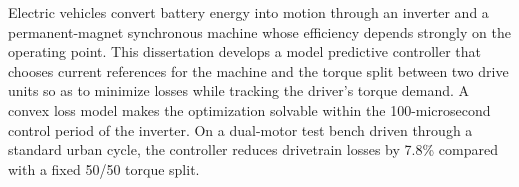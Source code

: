 Electric vehicles convert battery energy into motion through an inverter and a permanent-magnet
synchronous machine whose efficiency depends strongly on the operating point. This dissertation
develops a model predictive controller that chooses current references for the machine and the
torque split between two drive units so as to minimize losses while tracking the driver's torque
demand. A convex loss model makes the optimization solvable within the 100-microsecond control
period of the inverter. On a dual-motor test bench driven through a standard urban cycle, the
controller reduces drivetrain losses by 7.8\% compared with a fixed 50/50 torque split.
